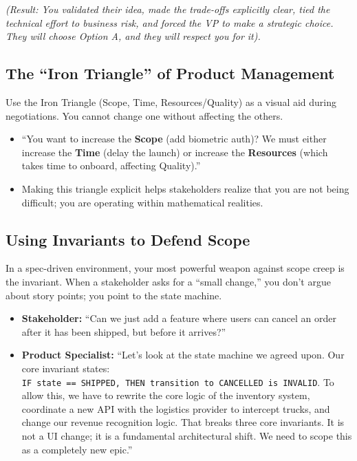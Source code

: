 \emph{(Result: You validated their idea, made the trade-offs explicitly
clear, tied the technical effort to business risk, and forced the VP to
make a strategic choice. They will choose Option A, and they will
respect you for it).}

\subsection{The ``Iron Triangle'' of Product
Management}\label{the-iron-triangle-of-product-management}

Use the Iron Triangle (Scope, Time, Resources/Quality) as a visual aid
during negotiations. You cannot change one without affecting the others.

\begin{itemize}
\tightlist
\item
  ``You want to increase the \textbf{Scope} (add biometric auth)? We
  must either increase the \textbf{Time} (delay the launch) or increase
  the \textbf{Resources} (which takes time to onboard, affecting
  Quality).''
\item
  Making this triangle explicit helps stakeholders realize that you are
  not being difficult; you are operating within mathematical realities.
\end{itemize}

\subsection{Using Invariants to Defend
Scope}\label{using-invariants-to-defend-scope}

In a spec-driven environment, your most powerful weapon against scope
creep is the invariant. When a stakeholder asks for a ``small change,''
you don't argue about story points; you point to the state machine.

\begin{itemize}
\tightlist
\item
  \textbf{Stakeholder:} ``Can we just add a feature where users can
  cancel an order after it has been shipped, but before it arrives?''
\item
  \textbf{Product Specialist:} ``Let's look at the state machine we
  agreed upon. Our core invariant states:
  \texttt{IF\ state\ ==\ SHIPPED,\ THEN\ transition\ to\ CANCELLED\ is\ INVALID}.
  To allow this, we have to rewrite the core logic of the inventory
  system, coordinate a new API with the logistics provider to intercept
  trucks, and change our revenue recognition logic. That breaks three
  core invariants. It is not a UI change; it is a fundamental
  architectural shift. We need to scope this as a completely new epic.''
\end{itemize}

